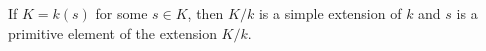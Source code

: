 If $K = k(s)$ for some $s \in K$, then $K/k$ is a simple extension of $k$ and $s$ is a primitive element of the extension $K/k$.

